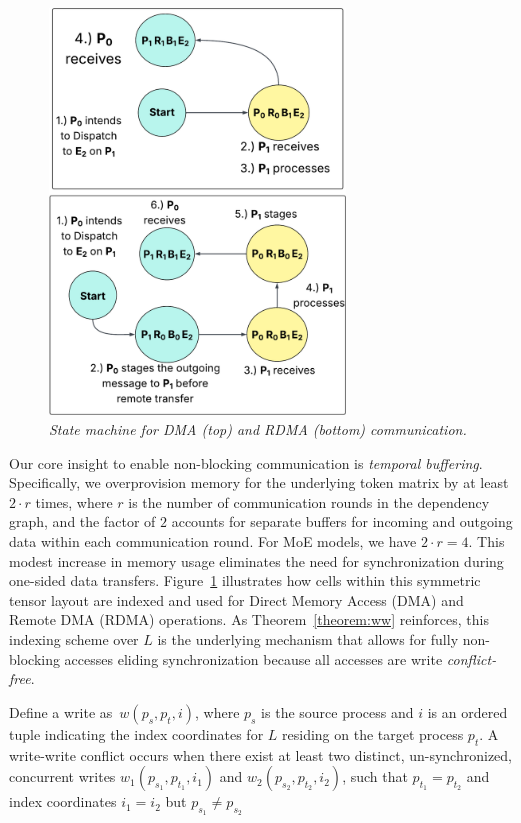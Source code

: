 \begin{figure}[!ht]
    \centering
    \includegraphics[width=0.7\textwidth, keepaspectratio]{figures/sm_big}
    \caption{\emph{State machine for DMA (top) and RDMA (bottom) communication.}}
    \label{fig:sm}
\end{figure}
Our core insight to enable non-blocking communication is \emph{temporal buffering}.
Specifically, we overprovision memory for the underlying token matrix by at least $2 \cdot r$ times, where $r$ is the number of communication rounds in the dependency graph, and the factor of $2$ accounts for separate buffers for incoming and outgoing data within each communication round. For MoE models, we have $2 \cdot r = 4$.
This modest increase in memory usage eliminates the need for synchronization during one-sided data transfers.
Figure~\ref{fig:sm} illustrates how cells within this symmetric tensor layout are indexed
and used for Direct Memory Access (DMA) and Remote DMA (RDMA) operations.
As Theorem~\ref{theorem:ww} reinforces,
this indexing scheme over $L$ is the underlying mechanism that allows for fully non-blocking accesses eliding
synchronization because all accesses are write \emph{conflict-free}.
\begin{definition}
    Define a write as~$w(p_s, p_t, i)$, where $p_s$ is the source process and $i$ is an ordered tuple
    indicating the index coordinates for $L$ residing on the target process $p_t$.
    A write-write conflict occurs when there exist at least two distinct, un-synchronized, concurrent writes
    $w_1(p_{s_1}, p_{t_1}, i_1)$ and $w_2(p_{s_2}, p_{t_2}, i_2)$, such that
    $p_{t_1} = p_{t_2}$ and index coordinates $i_1 = i_2$ but $p_{s_1} \neq p_{s_2}$
\end{definition}

